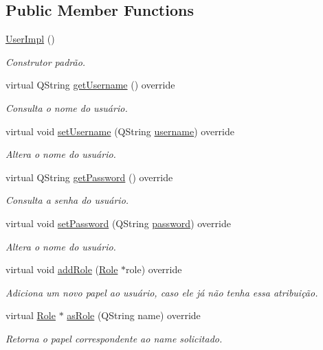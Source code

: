\subsection*{Public Member Functions}
\begin{DoxyCompactItemize}
\item 
\hyperlink{classUserImpl_a247633b3d3fb9449719bd9c12873b4cb}{User\+Impl} ()\hypertarget{classUserImpl_a247633b3d3fb9449719bd9c12873b4cb}{}\label{classUserImpl_a247633b3d3fb9449719bd9c12873b4cb}

\begin{DoxyCompactList}\small\item\em Construtor padrão. \end{DoxyCompactList}\item 
virtual Q\+String \hyperlink{classUserImpl_abefec7a8158c1304813d0304cf28d79f}{get\+Username} () override
\begin{DoxyCompactList}\small\item\em Consulta o nome do usuário. \end{DoxyCompactList}\item 
virtual void \hyperlink{classUserImpl_aeaf34ca2e23f1a673a6997cae77f7452}{set\+Username} (Q\+String \hyperlink{classUserImpl_aa4cc87da6bbd23b8a3c88dabbe3026f3}{username}) override
\begin{DoxyCompactList}\small\item\em Altera o nome do usuário. \end{DoxyCompactList}\item 
virtual Q\+String \hyperlink{classUserImpl_a38f1527c6ca0b75401bddd68858050bd}{get\+Password} () override
\begin{DoxyCompactList}\small\item\em Consulta a senha do usuário. \end{DoxyCompactList}\item 
virtual void \hyperlink{classUserImpl_ae25b0e053e4a3f6b6d4ddf601cb9d7d1}{set\+Password} (Q\+String \hyperlink{classUserImpl_a4213f64d517183df08c5dab39398bbd0}{password}) override
\begin{DoxyCompactList}\small\item\em Altera o nome do usuário. \end{DoxyCompactList}\item 
virtual void \hyperlink{classUserImpl_a80b1ee2caff4b1ae1c67076096f1acf5}{add\+Role} (\hyperlink{classRole}{Role} $\ast$role) override
\begin{DoxyCompactList}\small\item\em Adiciona um novo papel ao usuário, caso ele já não tenha essa atribuição. \end{DoxyCompactList}\item 
virtual \hyperlink{classRole}{Role} $\ast$ \hyperlink{classUserImpl_a7ee6cdd620e02d565b78f1655aa1b980}{as\+Role} (Q\+String name) override
\begin{DoxyCompactList}\small\item\em Retorna o papel correspondente ao name solicitado. \end{DoxyCompactList}\end{DoxyCompactItemize}
